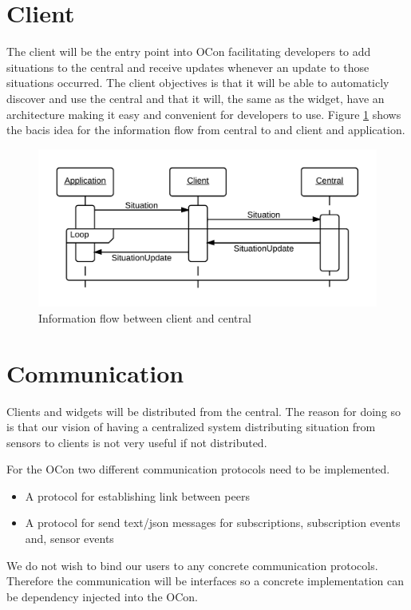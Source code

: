 \documentclass[../report.tex]{subfiles}
\begin{document}
\section{Client}

The client will be the entry point into OCon facilitating developers to add situations to the central and receive updates whenever an update to those situations occurred. The client objectives is that it will be able to automaticly discover and use the central and that it will, the same as the widget, have an architecture making it easy and convenient for developers to use. Figure \ref{seqclient} shows the bacis idea for the information flow from central to and client and application.


\begin{figure}[h]
\centering
\includegraphics[width=\linewidth]{clientsequencediagram.png}
\caption{Information flow between client and central}
\label{seqclient}
\end{figure}


\section{Communication}

Clients and widgets will be distributed from the central. The reason for doing so is that our vision of having a centralized system distributing situation from sensors to clients is not very useful if not distributed.

For the OCon two different communication protocols need to be implemented.\\

\begin{itemize}
    \item A protocol for establishing link between peers
    \item A protocol for send text/json messages for subscriptions, subscription events and, sensor events \\
\end{itemize}

We do not wish to bind our users to any concrete communication protocols. Therefore the communication will be interfaces so a concrete implementation can be dependency injected into the OCon.
\end{document}
